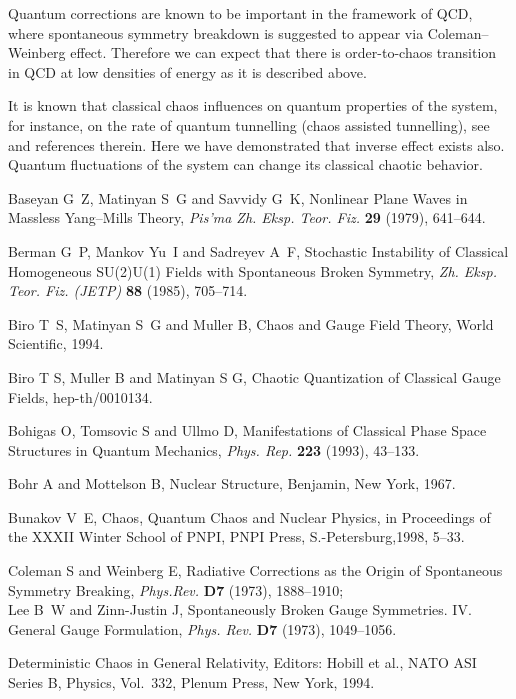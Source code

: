 \documentclass[a4paper,12pt]{article}
\begin{document}
Quantum corrections are known to be important in the framework of QCD, where
spontaneous symmetry breakdown is suggested to appear via Coleman--Weinberg effect.
Therefore we can expect that there is order-to-chaos transition in QCD at low
densities of energy as it is described above.

It is known that classical chaos influences on quantum properties of the system, for
instance, on the rate of quantum tunnelling (chaos assisted tunnelling), see~\cite{B}
and references therein. Here we have demonstrated that inverse effect exists also.
Quantum fluctuations of the system can change its classical chaotic behavior.

\begin{thebibliography}{99}
\small

 Baseyan G~Z, Matinyan S~G and  Savvidy G~K, Nonlinear Plane Waves in
Massless Yang--Mills Theory, {\it Pis'ma Zh. Eksp. Teor. Fiz.} {\bf 29} (1979),
641--644.

 Berman G~P, Mankov Yu~I and  Sadreyev A~F, Stochastic Instability of Classical
Homogeneous SU(2)\myHighlight{$\, \otimes\,$}\coordHE{}U(1) Fields with Spontaneous Broken Symmetry, {\it Zh.
Eksp. Teor. Fiz. (JETP)} {\bf 88} (1985), 705--714.

 Biro T~S, Matinyan S~G and Muller B, Chaos and
Gauge Field Theory, World Scientific, 1994.

 Biro T S, Muller B and Matinyan S G, Chaotic Quantization of Classical
Gauge Fields, hep-th/0010134.

 Bohigas O, Tomsovic S and Ullmo D,
Manifestations of Classical Phase Space Structures in Quantum Mechanics, {\it Phys.
Rep.} {\bf 223} (1993), 43--133.

 Bohr A and Mottelson B, Nuclear Structure, Benjamin, New York, 1967.

  Bunakov V~E, Chaos, Quantum Chaos and Nuclear Physics,
in Proceedings of the XXXII Winter School of PNPI,  PNPI Press, S.-Petersburg,1998,
5--33.

  Coleman  S and  Weinberg E, Radiative Corrections as the Origin of
Spontaneous Symmetry Breaking, {\it Phys.Rev.} {\bf D7} (1973), 1888--1910;\\
Lee B~W and Zinn-Justin J, Spontaneously Broken Gauge Symmetries. IV. General Gauge
Formulation, {\it Phys. Rev.} {\bf D7} (1973), 1049--1056.

 Deterministic Chaos in General Relativity, Editors:
Hobill et al., NATO ASI Series B, Physics,  Vol.~332, Plenum Press, New York, 1994.


\end{thebibliography}
\end{document}

